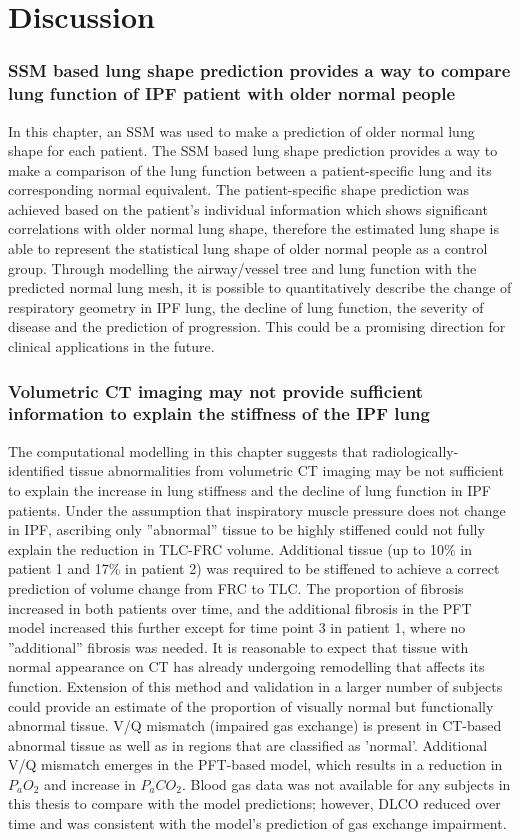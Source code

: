 \section{Discussion}

\subsubsection{SSM based lung shape prediction provides a way to compare lung function of IPF patient with older normal people}
In this chapter, an SSM was used to make a prediction of older normal lung shape for each patient. The SSM based lung shape prediction provides a way to make a comparison of the lung function between a patient-specific lung and its corresponding normal equivalent. The patient-specific shape prediction was achieved based on the patient's individual information which shows significant correlations with older normal lung shape, therefore the estimated lung shape is able to represent the statistical lung shape of older normal people as a control group. Through modelling the airway/vessel tree and lung function with the predicted normal lung mesh, it is possible to quantitatively describe the change of respiratory geometry in IPF lung, the decline of lung function, the severity of disease and the prediction of progression. This could be a promising direction for clinical applications in the future.

\subsubsection{Volumetric CT imaging may not provide sufficient information to explain the stiffness of the IPF lung}
The computational modelling in this chapter suggests that radiologically-identified tissue abnormalities from volumetric CT imaging may be not sufficient to explain the increase in lung stiffness and the decline of lung function in IPF patients. Under the assumption that inspiratory muscle pressure does not change in IPF, ascribing only ''abnormal'' tissue to be highly stiffened could not fully explain the reduction in TLC-FRC volume. Additional tissue (up to 10\% in patient 1 and 17\% in patient 2) was required to be stiffened to achieve a correct prediction of volume change from FRC to TLC. The proportion of fibrosis increased in both patients over time, and the additional fibrosis in the PFT model increased this further except for time point 3 in patient 1, where no ''additional'' fibrosis was needed. It is reasonable to expect that tissue with normal appearance on CT has already undergoing remodelling that affects its function. Extension of this method and validation in a larger number of subjects could provide an estimate of the proportion of visually normal but functionally abnormal tissue. V/Q mismatch (impaired gas exchange) is present in CT-based abnormal tissue as well as in regions that are classified as 'normal'. Additional V/Q mismatch emerges in the PFT-based model, which results in a reduction in $P_aO_2$ and increase in $P_aCO_2$. Blood gas data was not available for any subjects in this thesis to compare with the model predictions; however, DLCO reduced over time and was consistent with the model's prediction of gas exchange impairment.

